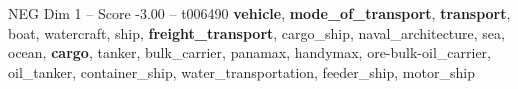 \begin{textsample}{NEG Dim 1 – Score -3.00 – t006490}  \label{ex:f1_neg_024}
\textbf{vehicle}, \textbf{mode\_of\_transport}, \textbf{transport}, boat, watercraft, ship, \textbf{freight\_transport}, cargo\_ship, naval\_architecture, sea, ocean, \textbf{cargo}, tanker, bulk\_carrier, panamax, handymax, ore-bulk-oil\_carrier, oil\_tanker, container\_ship, water\_transportation, feeder\_ship, motor\_ship

\end{textsample}
